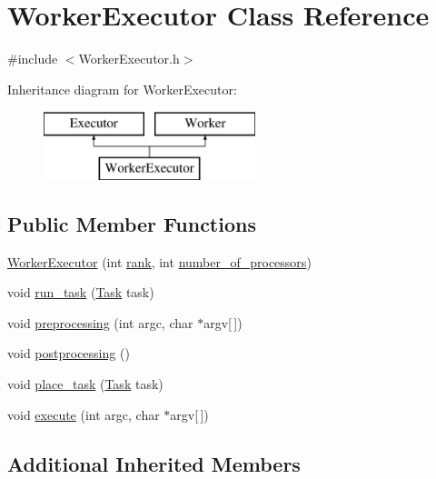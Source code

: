 \hypertarget{class_worker_executor}{}\section{Worker\+Executor Class Reference}
\label{class_worker_executor}


{\ttfamily \#include $<$Worker\+Executor.\+h$>$}

Inheritance diagram for Worker\+Executor\+:\begin{figure}[H]
\begin{center}
\leavevmode
\includegraphics[height=2.000000cm]{class_worker_executor}
\end{center}
\end{figure}
\subsection*{Public Member Functions}
\begin{DoxyCompactItemize}
\item 
\hyperlink{class_worker_executor_aae5a80d4f64f2bc795b175697e15225f}{Worker\+Executor} (int \hyperlink{class_executor_a33c24e2887b4d9c4ef7f3566d3bc803e}{rank}, int \hyperlink{class_executor_a4e798bde66d26fe200de7e8d2b54e915}{number\+\_\+of\+\_\+processors})
\item 
void \hyperlink{class_worker_executor_a7edee52a5d96dea5da7dc0e0ba461b45}{run\+\_\+task} (\hyperlink{_types_8h_a0c77930ab3818a1680c59353f627fba8}{Task} task)
\item 
void \hyperlink{class_worker_executor_ac3155d06d7807a1d9d305293b92d63ab}{preprocessing} (int argc, char $\ast$argv\mbox{[}$\,$\mbox{]})
\item 
void \hyperlink{class_worker_executor_aff4c1b156960d031d09e669014038cd5}{postprocessing} ()
\item 
void \hyperlink{class_worker_executor_a50f9307b592bb371535e00461d7d0133}{place\+\_\+task} (\hyperlink{_types_8h_a0c77930ab3818a1680c59353f627fba8}{Task} task)
\item 
void \hyperlink{class_worker_executor_adb37338d137f4039d835519b14698d51}{execute} (int argc, char $\ast$argv\mbox{[}$\,$\mbox{]})
\end{DoxyCompactItemize}
\subsection*{Additional Inherited Members}


